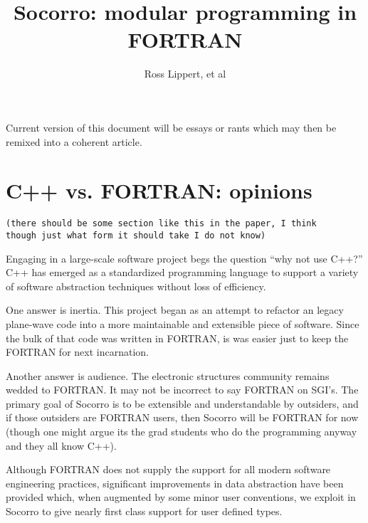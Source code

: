 \documentclass[letterpaper]{article}
\title{Socorro: modular programming in FORTRAN}
\author{Ross Lippert, et al}
\begin{document}
\maketitle

Current version of this document will be essays or rants
which may then be remixed into a coherent article.


\section{C++ vs. FORTRAN: opinions}

\begin{verbatim}
(there should be some section like this in the paper, I think
though just what form it should take I do not know)
\end{verbatim}

Engaging in a large-scale software project begs the question
``why not use C++?''  C++ has emerged as a standardized
programming language to support a variety of software abstraction
techniques without loss of efficiency.

One answer is inertia.  This project began as an attempt to refactor
an legacy plane-wave code into a more maintainable and extensible
piece of software.  Since the bulk of that code was written in
FORTRAN, is was easier just to keep the FORTRAN for next incarnation.

Another answer is audience.  The electronic structures community
remains wedded to FORTRAN.  It may not be incorrect to say FORTRAN on
SGI's.  The primary goal of Socorro is to be extensible and
understandable by outsiders, and if those outsiders are FORTRAN users,
then Socorro will be FORTRAN for now (though one might argue its the
grad students who do the programming anyway and they all know C++).

Although FORTRAN does not supply the support for all modern software
engineering practices, significant improvements in data abstraction
have been provided which, when augmented by some minor user
conventions, we exploit in Socorro to give nearly first class support
for user defined types.






\end{document}
